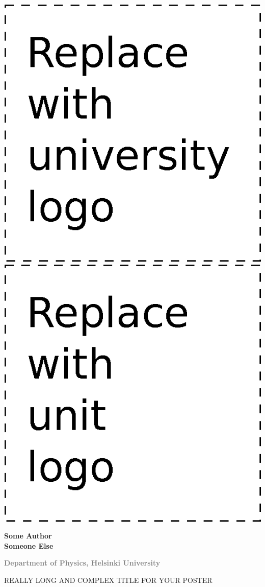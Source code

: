 \documentclass[portrait,a0]{a0poster}
\begin{document}

\begin{minipage}[t]{0.98\linewidth} %
\vspace{0pt} %


\begin{minipage}[t]{0.48\linewidth} %
\vspace{0pt} %
\includegraphics[width=0.4\linewidth]{hy-logo}
\hspace{50pt}
\includegraphics[width=0.4\linewidth]{org-unit-logo}

\end{minipage} %
\begin{minipage}[t]{0.5\linewidth} %
\vspace{0pt} %

\textsf{\bfseries
Some Author \\
Someone Else
} 

\textcolor{gray}{\textsf{\bfseries{Department of Physics, Helsinki University}}}

\end{minipage}
\begin{minipage}[t]{1\linewidth}
\vspace{70pt}

\begin{spacing}{5.5}
{\Huge{}\textcolor{facultyColor}{\MakeUppercase{Really long}} \MakeUppercase{and complex title for your poster}}
\end{spacing}

\end{minipage}
\end{minipage}
\end{document}
